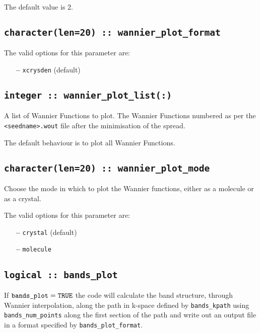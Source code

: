 The default value is 2.

\subsection[wannier\_plot\_format]{\tt character(len=20) :: wannier\_plot\_format}

The valid options for this parameter are:
\begin{itemize}
\item[{\bf --}] \verb#xcrysden# (default)
\end{itemize}

\subsection[wannier\_plot\_list]{\tt integer :: wannier\_plot\_list(:)}

 A list of Wannier Functions to plot. The Wannier Functions numbered as per the
 {\tt <seedname>.wout} file after the minimisation of the spread.

 The default behaviour is to plot all Wannier Functions.

\subsection[wannier\_plot\_mode]{\tt character(len=20) :: wannier\_plot\_mode}

Choose the mode in which to plot the Wannier functions, either as a molecule
or as a crystal.

The valid options for this parameter are:
\begin{itemize}
\item[{\bf --}] \verb#crystal# (default)
\item[{\bf --}] \verb#molecule# 
\end{itemize}

\subsection[bands\_plot]{\tt logical :: bands\_plot}

If $\verb#bands_plot#=\verb#TRUE#$ the code will calculate the band
structure, through Wannier interpolation,
 along
the path in k-space defined by \verb#bands_kpath# using \verb#bands_num_points# along the first
section of the path and write out an output file in a format specified
by \verb#bands_plot_format#. 

